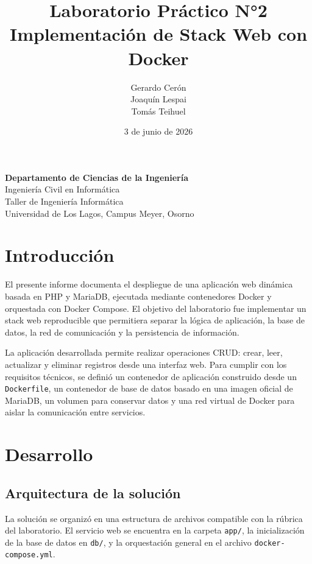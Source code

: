 \documentclass[12pt]{article}
\title{
    \textbf{Laboratorio Práctico N°2}\\
    \large Implementación de Stack Web con Docker
}
\author{
    Gerardo Cerón\\
    Joaquín Lespai\\
    Tomás Teihuel
}
\date{3 de junio de 2026}
\begin{document}
\maketitle

\begin{center}
    \textbf{Departamento de Ciencias de la Ingeniería}\\
    Ingeniería Civil en Informática\\
    Taller de Ingeniería Informática\\
    Universidad de Los Lagos, Campus Meyer, Osorno
\end{center}

\newpage
\tableofcontents
\newpage

\section{Introducción}

El presente informe documenta el despliegue de una aplicación web dinámica basada en PHP y MariaDB, ejecutada mediante contenedores Docker y orquestada con Docker Compose. El objetivo del laboratorio fue implementar un stack web reproducible que permitiera separar la lógica de aplicación, la base de datos, la red de comunicación y la persistencia de información.

La aplicación desarrollada permite realizar operaciones CRUD: crear, leer, actualizar y eliminar registros desde una interfaz web. Para cumplir con los requisitos técnicos, se definió un contenedor de aplicación construido desde un \texttt{Dockerfile}, un contenedor de base de datos basado en una imagen oficial de MariaDB, un volumen para conservar datos y una red virtual de Docker para aislar la comunicación entre servicios.

\section{Desarrollo}

\subsection{Arquitectura de la solución}

La solución se organizó en una estructura de archivos compatible con la rúbrica del laboratorio. El servicio web se encuentra en la carpeta \texttt{app/}, la inicialización de la base de datos en \texttt{db/}, y la orquestación general en el archivo \texttt{docker-compose.yml}.
\end{document}
